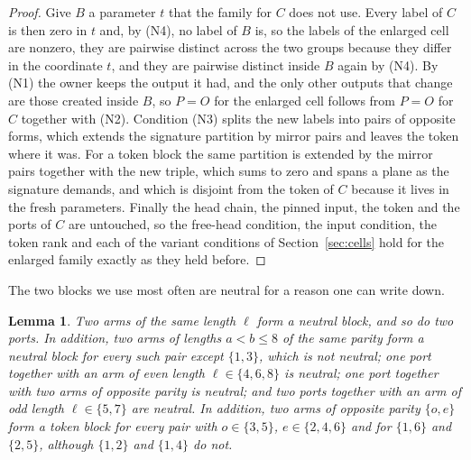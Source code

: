 \documentclass[11pt,a4paper]{article}
\theoremstyle{plain}
\newtheorem{lemma}[theorem]{Lemma}
\theoremstyle{definition}
\theoremstyle{remark}
\begin{document}
\begin{proof}
Give $B$ a parameter $t$ that the family for $C$ does not use.  Every label of
$C$ is then zero in $t$ and, by (N4), no label of $B$ is, so the labels of the
enlarged cell are nonzero, they are pairwise distinct across the two groups
because they differ in the coordinate $t$, and they are pairwise distinct
inside $B$ again by (N4).  By (N1) the owner keeps the output it had, and the
only other outputs that change are those created inside $B$, so $P=O$ for the
enlarged cell follows from $P=O$ for $C$ together with (N2).  Condition (N3)
splits the new labels into pairs of opposite forms, which extends the
signature partition by mirror pairs and leaves the token where it was.  For a
token block the same partition is extended by the mirror pairs together with
the new triple, which sums to zero and spans a plane as the signature demands,
and which is disjoint from the token of $C$ because it lives in the fresh
parameters.
Finally the head chain, the pinned input, the token and the ports of $C$ are
untouched, so the free-head condition, the input condition, the token rank
and each of the variant conditions of Section~\ref{sec:cells} hold for the
enlarged family exactly as they held before.
\end{proof}

The two blocks we use most often are neutral for a reason one can write down.

\begin{lemma}\label{lem:neutralpairs}
Two arms of the same length $\ell$ form a neutral block, and so do two ports.
In addition, two arms of lengths $a<b\le8$ of the same parity form a neutral
block for every such pair except $\{1,3\}$, which is not neutral; one port
together with an arm of even length $\ell\in\{4,6,8\}$ is neutral; one port
together with two arms of opposite parity is neutral; and two ports together
with an arm of odd length $\ell\in\{5,7\}$ are neutral.  In addition, two arms
of opposite parity $\{o,e\}$ form a token block for every pair with
$o\in\{3,5\}$, $e\in\{2,4,6\}$ and for $\{1,6\}$ and $\{2,5\}$, although
$\{1,2\}$ and $\{1,4\}$ do not.
\end{lemma}
\end{document}
